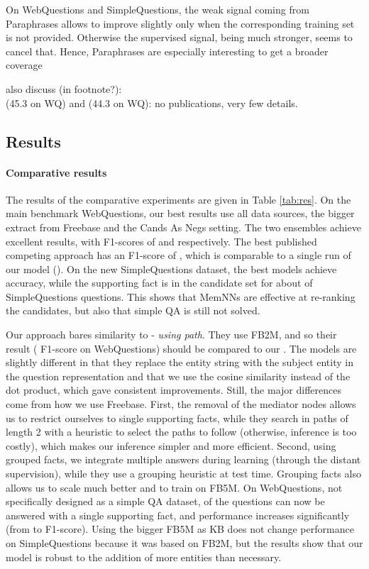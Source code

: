\documentclass[11pt,a4paper]{article}
\newcommand{\fb}{{\sf Freebase}\xspace}
\newcommand{\wq}{{\sf WebQuestions}\xspace}
\newcommand{\fbq}{{\sf SimpleQuestions}\xspace}
\newcommand{\fbs}{{\sf FB2M}\xspace}
\newcommand{\fbb}{{\sf FB5M}\xspace}
\newcommand{\prp}{{\sf Paraphrases}\xspace}
\begin{document}
On \wq and \fbq, the weak signal coming from \prp allows to
  improve slightly only when the corresponding training set is not
  provided. Otherwise the supervised signal, being much stronger,
  seems to cancel that. Hence, \prp are especially interesting to get
  a broader coverage

also discuss (in footnote?):\\
\cite{wang2014overview} (45.3 on WQ) and
\cite{yao-scratch-qa-naacl2015} (44.3 on WQ): no publications, very
few details.
\fi

\subsection{Results}

\paragraph{Comparative results}
The results of the comparative experiments are given in Table
\ref{tab:res}. 
On the main benchmark \wq, our best results use all data sources, the
bigger extract from \fb and the {\sc Cands As Negs} setting. The two
ensembles achieve excellent results, with F1-scores of 
and  respectively. The best published competing approach
\cite{yang2014joint} has an F1-score of , which is comparable
to a single run of our model (). On the new \fbq dataset, the
best models achieve  accuracy, while the supporting fact is
in the candidate set for about  of \fbq questions. This shows
that MemNNs are effective at re-ranking the candidates, but also that
simple QA is still not solved.



Our approach bares similarity to
\cite{bordes-chopra-weston:2014:EMNLP2014} - {\it using path}. They
use \fbs, and so their result ( F1-score on \wq) should be
compared to our . The models are slightly different in that
they replace the entity string with the subject entity in the question
representation and that we use the cosine similarity instead of the
dot product, which gave consistent improvements. Still, the major
differences come from how we use \fb. First, the removal of the
mediator nodes allows us to restrict ourselves to single supporting
facts, while they search in paths of length 2 with a heuristic to
select the paths to follow (otherwise, inference is too costly), which
makes our inference simpler and more efficient. Second, using grouped
facts, we integrate multiple answers during learning (through the
distant supervision), while they use a grouping heuristic at test
time. Grouping facts also allows us to scale much better and to train
on \fbb. On \wq, not specifically designed as a simple QA dataset,
 of the questions can now be answered with a single supporting
fact, and performance increases significantly (from  to
 F1-score). Using the bigger \fbb as KB does not change performance on \fbq
because it was based on \fbs, but the results show that our model is
robust to the addition of more entities than necessary.
\end{document}
